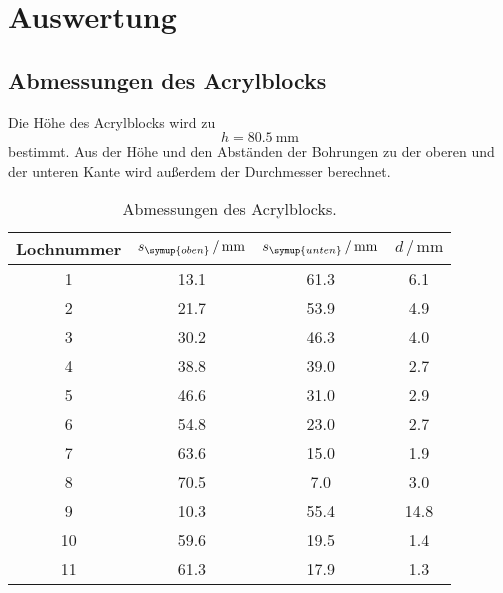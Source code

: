 \section{Auswertung}
\label{sec:Auswertung}

\subsection{Abmessungen des Acrylblocks}
\label{sec:Abmessungen}
Die Höhe des Acrylblocks wird zu
\begin{equation*}
    h = \qty{80,5}{\milli\metre}
\end{equation*}
bestimmt. Aus der Höhe und den Abständen der Bohrungen zu der oberen und der unteren Kante wird außerdem der Durchmesser berechnet.
\begin{table}[H]
    \centering
    \caption{Abmessungen des Acrylblocks.}
    \label{tab:Schieblehre}
    \begin{tabular}{S[table-format=2.0] S[table-format=2.1] S[table-format=2.1] S[table-format=2.1]}
        \toprule
         {Lochnummer} & {$s_{\symup{oben}}\,/\,\unit{\milli\metre}$} & {$s_{\symup{unten}}\,/\,\unit{\milli\metre}$} %
         & {$d\,/\,\unit{\milli\metre}$}\\
        	& 13.1	& 61.3 &  6.1 \\
         2	& 21.7	& 53.9 &  4.9 \\
         3	& 30.2	& 46.3 &  4.0 \\
         4	& 38.8	& 39.0 &  2.7 \\
         5	& 46.6	& 31.0 &  2.9 \\
         6	& 54.8	& 23.0 &  2.7 \\
         7	& 63.6	& 15.0 &  1.9 \\
         8	& 70.5	&  7.0 &  3.0 \\
         9	& 10.3	& 55.4 & 14.8 \\
         10	& 59.6	& 19.5 &  1.4 \\
         11	& 61.3	& 17.9 &  1.3 \\
        \bottomrule 
    \end{tabular}
  \end{table}

